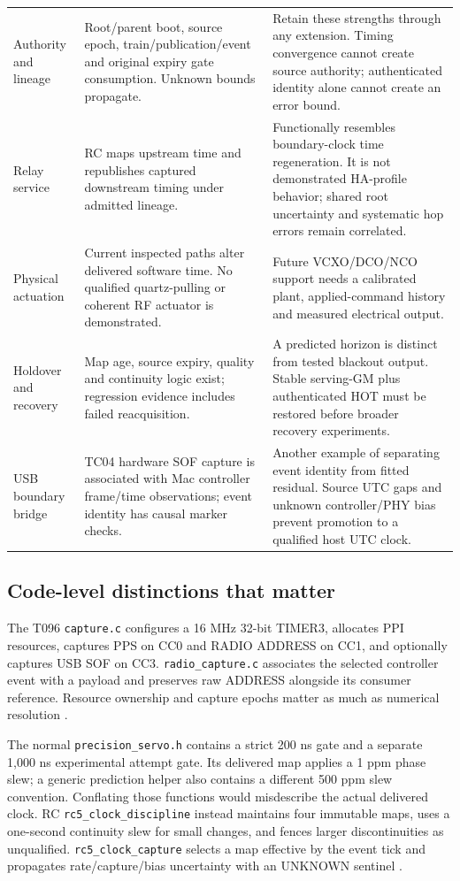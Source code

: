 \documentclass[11pt,letterpaper]{article}
\newcommand{\code}[1]{\texttt{#1}}
\begin{document}
\begin{longtable}{L{2.5cm}L{5.0cm}L{7.05cm}}
Authority and lineage & Root/parent boot, source epoch, train/publication/event and original expiry gate consumption. Unknown bounds propagate. & Retain these strengths through any extension. Timing convergence cannot create source authority; authenticated identity alone cannot create an error bound. \\
Relay service & RC maps upstream time and republishes captured downstream timing under admitted lineage. & Functionally resembles boundary-clock time regeneration. It is not demonstrated HA-profile behavior; shared root uncertainty and systematic hop errors remain correlated. \\
Physical actuation & Current inspected paths alter delivered software time. No qualified quartz-pulling or coherent RF actuator is demonstrated. & Future VCXO/DCO/NCO support needs a calibrated plant, applied-command history and measured electrical output. \\
Holdover and recovery & Map age, source expiry, quality and continuity logic exist; regression evidence includes failed reacquisition. & A predicted horizon is distinct from tested blackout output. Stable serving-GM plus authenticated HOT must be restored before broader recovery experiments. \\
USB boundary bridge & TC04 hardware SOF capture is associated with Mac controller frame/time observations; event identity has causal marker checks. & Another example of separating event identity from fitted residual. Source UTC gaps and unknown controller/PHY bias prevent promotion to a qualified host UTC clock. \\
\bottomrule
\end{longtable}
\normalsize

\subsection{Code-level distinctions that matter}
The T096 \code{capture.c} configures a 16 MHz 32-bit TIMER3, allocates PPI resources, captures PPS on CC0 and RADIO ADDRESS on CC1, and optionally captures USB SOF on CC3. \code{radio\_capture.c} associates the selected controller event with a payload and preserves raw ADDRESS alongside its consumer reference. Resource ownership and capture epochs matter as much as numerical resolution \cite{localcode}.

The normal \code{precision\_servo.h} contains a strict 200 ns gate and a separate 1,000 ns experimental attempt gate. Its delivered map applies a 1 ppm phase slew; a generic prediction helper also contains a different 500 ppm slew convention. Conflating those functions would misdescribe the actual delivered clock. RC \code{rc5\_clock\_discipline} instead maintains four immutable maps, uses a one-second continuity slew for small changes, and fences larger discontinuities as unqualified. \code{rc5\_clock\_capture} selects a map effective by the event tick and propagates rate/capture/bias uncertainty with an UNKNOWN sentinel \cite{localcode}.
\end{document}
